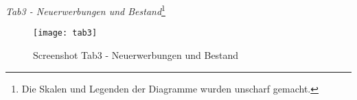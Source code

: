 \clearpage
    
    

    \recalctypearea
    \textit{Tab3 - Neuerwerbungen und Bestand}\footnote{ Die Skalen und Legenden der Diagramme wurden unscharf gemacht.}
    \begin{figure}[H]
        \centering
            \texttt{[image: tab3]}
            \caption{Screenshot Tab3 - Neuerwerbungen und Bestand}
            \label{fig:tab3}
    \end{figure}

    \recalctypearea 
    \begingroup
    \setlength{\tabcolsep}{12pt} %
    \renewcommand{\arraystretch}{1.0} 
